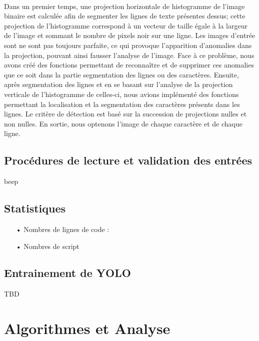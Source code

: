 \documentclass[a4paper]{article}
\begin{document}
			\paragraph{} Dans un premier temps, une projection horizontale de histogramme de l'image binaire est calculée afin de segmenter les lignes de texte présentes dessus; cette projection de l'histogramme correspond à un vecteur de taille égale à la largeur de l'image et sommant le nombre de pixels noir sur une ligne.%
Les images d'entrée sont ne sont pas toujours parfaite, ce qui provoque l'apparition d'anomalies dans la projection, pouvant ainsi fausser l'analyse de l'image. Face à ce problème, nous avons créé des fonctions permettant de reconnaître et de supprimer ces anomalies que ce soit dans la partie segmentation des lignes ou des caractères.
Ensuite, après segmentation des lignes et en se basant sur l'analyse de la projection verticale de l'histogramme de celles-ci, nous avions implémenté des fonctions permettant la localisation et la segmentation des caractères présents dans les lignes. 
Le critère de détection est basé sur la succession de projections nulles et non nulles. En sortie, nous optenons l'image de chaque caractère et de chaque ligne.
			
		\subsection{Procédures de lecture et validation des entrées}
			beep	
		\subsection{Statistiques}
			\begin{itemize}
				\item[•] Nombres de lignes de code : 
				\item[•] Nombres de script
			\end{itemize}
		\subsection{Entrainement de YOLO}
			TBD
	\section{Algorithmes et Analyse}
\end{document}
